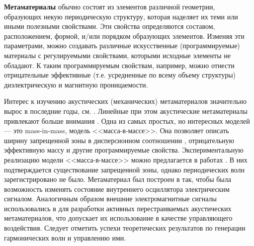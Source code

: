 \textbf{Метаматериалы} обычно состоят из элементов различной геометрии, образующих некую периодическую структуру, которая наделяет их теми или иными полезными свойствами. Эти свойства определяются составом, расположением, формой, и/или порядком образующих элементов. Изменяя эти параметрами, можно создавать различные искусственные (программируемые) материалы с регулируемыми свойствами, которыми исходные элементы не обладают. К таким программируемым свойствам, например, можно отнести отрицательные эффективные (т.е. усредненные по всему объему структуры) диэлектрическую и магнитную проницаемости.

Интерес к изучению акустических (механических) метаматериалов значительно вырос в последние годы, см. \cite{Cummer, Cvet, Huang2010, Ma, muller, delis1, Eremeyev2020, Porubov2019, Erofeev2020}. Линейные при этом акустические метаматериалы привлекают больше внимания \cite{Cvet, Huang2010, muller}. Одна из самых простых, но интересных моделей --- это mass-in-mass, модель <<масса-в-массе>>. Она позволяет описать ширину запрещенной зоны в дисперсионном соотношении \cite{Cvet, Huang2010}, отрицательную эффективную массу и другие программируемые свойства. 
Экспериментальную реализацию модели <<масса-в-массе>> можно предлагается в работах \cite{Cvet, Yang, Yao2008, Zhou2015}. В них подтверждается существование запрещенной зоны, однако периодических волн зарегистрировано не было. Метаматериал был построен в \cite{Yang} так, чтобы была возможность изменять состояние внутреннего осциллятора электрическим сигналом. Аналогичным образом внешние электромагнитные сигналы использовались в \cite{Chen2014, Xiao2015} для разработки активных перестраиваемых акустических метаматериалов, что допускает их использование в качестве управляющего воздействия. Следует отметить успехи теоретических результатов по генерации гармонических волн и управлению ими.

